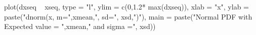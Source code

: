 \begin{Schunk}
\begin{Sinput}
  plot(dxseq ~ xseq, type = "l", ylim = c(0,1.2* max(dxseq)), xlab = "x", ylab = paste("dnorm(x, m=",xmean,", sd=", xsd,")"), main = paste("Normal PDF with Expected value = ",xmean," and sigma =", xsd))
\end{Sinput}
\end{Schunk}
